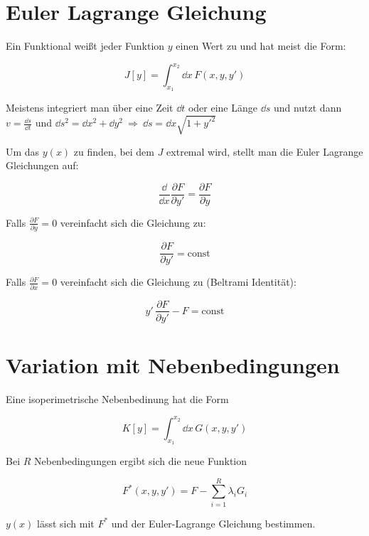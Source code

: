  \section{Euler Lagrange Gleichung}
 
 \begin{frameddefn}[Funktional]
 	Ein Funktional weißt jeder Funktion $y$ einen Wert zu und hat meist die Form:
 	
 	\[ J[y] = \int_{x_1}^{x_2} \dd x \, F(x, y, y') \]
 	
 	Meistens integriert man über eine Zeit $\dd t$ oder eine Länge $\dd s$ und nutzt dann $v = \frac{\dd s}{\dd t}$ und $\dd s^2 = \dd x^2 + \dd y^2 \ \Rightarrow \ \dd s = \dd x \sqrt{1+y'^2}$
 \end{frameddefn}
 
 \begin{framedthm}
 	
 	Um das $y(x)$ zu finden, bei dem $J$ extremal wird, stellt man die Euler Lagrange Gleichungen auf:
 	
 	\[ \frac{\dd}{\dd x} \frac{\partial F}{\partial y'} = \frac{\partial F}{\partial y} \]
 	
 	Falls $\frac{\partial F}{\partial y} = 0$ vereinfacht sich die Gleichung zu:
 	
 	\[ \frac{\partial F}{\partial y'} = \textrm{const} \]
 	
 	Falls $\frac{\partial F}{\partial x} = 0$ vereinfacht sich die Gleichung zu (Beltrami Identität):
 	
 	\[ y' \, \frac{\partial F}{\partial y'} - F = \textrm{const} \]
 	
 \end{framedthm}

\section{Variation mit Nebenbedingungen}

\begin{framedthm}
	Eine isoperimetrische Nebenbedinung hat die Form
	
	\[ K[y] = \int_{x_1}^{x_2} \dd x \, G(x, y, y') \]
	
	Bei $R$ Nebenbedingungen ergibt sich die neue Funktion
	
	\[ F^*(x, y, y') = F - \sum_{i=1}^R \lambda_i G_i \]
	
	$y(x)$ lässt sich mit $F^*$ und der Euler-Lagrange Gleichung bestimmen.
\end{framedthm}

